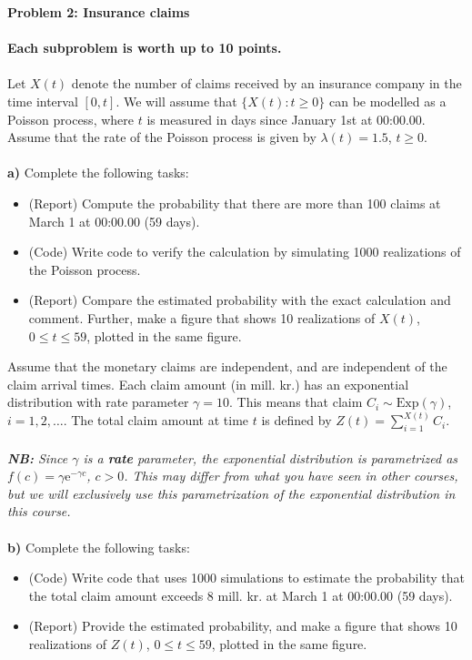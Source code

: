 \documentclass[1p]{article}		%
\begin{document}
\newpage
\noindent
{\LARGE \textbf{Problem 2: Insurance claims}}\\\\
\textbf{Each subproblem is worth up to 10 points.} \\\\
\noindent
Let $X(t)$ denote the number of claims received by an insurance company
in the time interval $[0, t]$. We will assume that $\{X(t): t \geq 0\}$ can be modelled
as a Poisson process, where $t$ is measured in days since January 1st at 00:00.00.
Assume that the rate of the Poisson process is given by $\lambda(t) = 1.5$, $t\geq 0$.\\\\
\textbf{a)} Complete the following tasks:
\begin{itemize}
  \item
    (Report) Compute the 
    probability that there are more than 100 claims at March 1 at 00:00.00 (59 days).
  \item
    (Code) Write code to verify the calculation by simulating 1000 realizations
    of the Poisson process.
  \item
    (Report) Compare the estimated probability with the exact calculation and comment. Further,
    make a figure that shows 10 realizations of $X(t)$, $ 0\leq t \leq 59$, plotted
in the same figure.
\end{itemize}
\vspace{0.1cm}

\noindent
Assume that the monetary claims are independent, and are independent of the claim
arrival times. Each claim amount (in mill. kr.) has an exponential distribution
with rate parameter $\gamma = 10$. This means that claim $C_i \sim \text{Exp}(\gamma)$,
$i = 1, 2, \ldots$. The total claim amount at time $t$ is defined
by $Z(t) = \sum_{i = 1}^{X(t)} C_i$. \\\\
\emph{\textbf{NB:} Since $\gamma$ is a \textbf{rate} parameter,
the exponential distribution is parametrized as $f(c) = \gamma \mathrm{e}^{-\gamma c}$, $c > 0$. This may
differ from what you have seen in other courses, but we will exclusively use this parametrization of
the exponential distribution in this course.} \\\\
\textbf{b)} Complete the following tasks:
\begin{itemize}
  \item
    (Code) Write code that uses 1000 simulations to estimate the 
    probability that the total claim amount exceeds 8 mill. kr. at March 1 at 00:00.00 (59 days).
  \item
    (Report) Provide the estimated probability, and
    make a figure that shows 10 realizations of $Z(t)$, $ 0\leq t \leq 59$, plotted
in the same figure.
\end{itemize}
\vspace{0.1cm}
\end{document}
